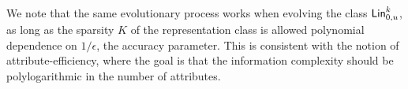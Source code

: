 \begin{remark} We note that the same evolutionary process works when evolving
the class $\mathsf{Lin}^k_{0, u}$, as long as the sparsity $K$ of the representation
class is allowed polynomial dependence on $1/\epsilon$, the accuracy parameter.
This is consistent with the notion of attribute-efficiency, where the goal is
that the information complexity should be polylogarithmic in the number of
attributes.
\end{remark}
